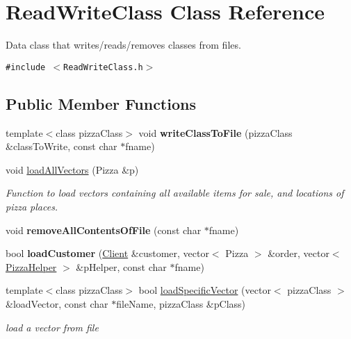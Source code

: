 \hypertarget{class_read_write_class}{
\section{Read\-Write\-Class Class Reference}
\label{class_read_write_class}
}
Data class that writes/reads/removes classes from files.  


{\tt \#include $<$Read\-Write\-Class.h$>$}

\subsection*{Public Member Functions}
\begin{CompactItemize}
\item 
\hypertarget{class_read_write_class_abb1ed8e2de573d0548c582c8df29de1}{
template$<$class pizza\-Class$>$ void {\bf write\-Class\-To\-File} (pizza\-Class \&class\-To\-Write, const char $\ast$fname)}
\label{class_read_write_class_abb1ed8e2de573d0548c582c8df29de1}

\item 
\hypertarget{class_read_write_class_7a6da2d64d652963e15693695f38b019}{
void \hyperlink{class_read_write_class_7a6da2d64d652963e15693695f38b019}{load\-All\-Vectors} (Pizza \&p)}
\label{class_read_write_class_7a6da2d64d652963e15693695f38b019}

\begin{CompactList}\small\item\em Function to load vectors containing all available items for sale, and locations of pizza places. \item\end{CompactList}\item 
\hypertarget{class_read_write_class_40de8d6c8e60d97ea037a48a0096fcfb}{
void {\bf remove\-All\-Contents\-Of\-File} (const char $\ast$fname)}
\label{class_read_write_class_40de8d6c8e60d97ea037a48a0096fcfb}

\item 
\hypertarget{class_read_write_class_3ec01a0a3f0e393ebe888dcdd9cdf0c9}{
bool {\bf load\-Customer} (\hyperlink{class_client}{Client} \&customer, vector$<$ Pizza $>$ \&order, vector$<$ \hyperlink{class_pizza_helper}{Pizza\-Helper} $>$ \&p\-Helper, const char $\ast$fname)}
\label{class_read_write_class_3ec01a0a3f0e393ebe888dcdd9cdf0c9}

\item 
\hypertarget{class_read_write_class_c853fce40cfb6790d054df75b933889f}{
template$<$class pizza\-Class$>$ bool \hyperlink{class_read_write_class_c853fce40cfb6790d054df75b933889f}{load\-Specific\-Vector} (vector$<$ pizza\-Class $>$ \&load\-Vector, const char $\ast$file\-Name, pizza\-Class \&p\-Class)}
\label{class_read_write_class_c853fce40cfb6790d054df75b933889f}

\begin{CompactList}\small\item\em load a vector from file \item\end{CompactList}\end{CompactItemize}


